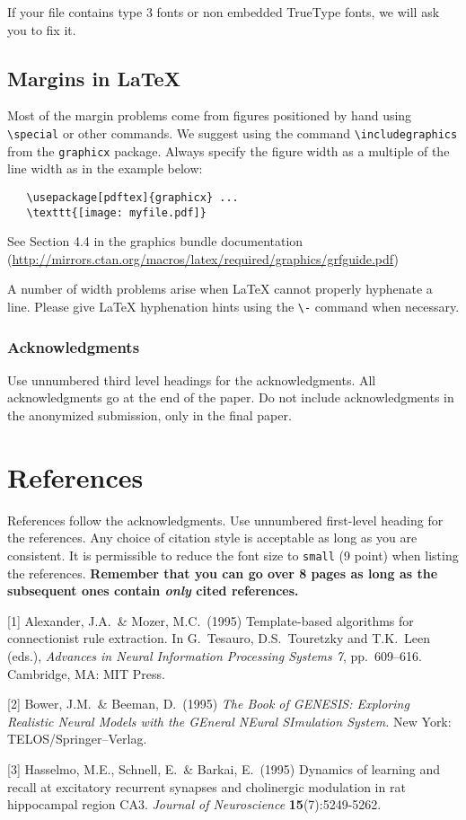 \documentclass{article}
\begin{document}
If your file contains type 3 fonts or non embedded TrueType fonts, we
will ask you to fix it.

\subsection{Margins in \LaTeX{}}

Most of the margin problems come from figures positioned by hand using
\verb+\special+ or other commands. We suggest using the command
\verb+\includegraphics+ from the \verb+graphicx+ package. Always
specify the figure width as a multiple of the line width as in the
example below:
\begin{verbatim}
   \usepackage[pdftex]{graphicx} ...
   \texttt{[image: myfile.pdf]}
\end{verbatim}
See Section 4.4 in the graphics bundle documentation
(\url{http://mirrors.ctan.org/macros/latex/required/graphics/grfguide.pdf})

A number of width problems arise when \LaTeX{} cannot properly
hyphenate a line. Please give LaTeX hyphenation hints using the
\verb+\-+ command when necessary.

\subsubsection*{Acknowledgments}

Use unnumbered third level headings for the acknowledgments. All
acknowledgments go at the end of the paper. Do not include
acknowledgments in the anonymized submission, only in the final paper.

\section*{References}

References follow the acknowledgments. Use unnumbered first-level
heading for the references. Any choice of citation style is acceptable
as long as you are consistent. It is permissible to reduce the font
size to \verb+small+ (9 point) when listing the references. {\bf
  Remember that you can go over 8 pages as long as the subsequent ones contain
  \emph{only} cited references.}
\medskip

\small

[1] Alexander, J.A.\ \& Mozer, M.C.\ (1995) Template-based algorithms
for connectionist rule extraction. In G.\ Tesauro, D.S.\ Touretzky and
T.K.\ Leen (eds.), {\it Advances in Neural Information Processing
  Systems 7}, pp.\ 609--616. Cambridge, MA: MIT Press.

[2] Bower, J.M.\ \& Beeman, D.\ (1995) {\it The Book of GENESIS:
  Exploring Realistic Neural Models with the GEneral NEural SImulation
  System.}  New York: TELOS/Springer--Verlag.

[3] Hasselmo, M.E., Schnell, E.\ \& Barkai, E.\ (1995) Dynamics of
learning and recall at excitatory recurrent synapses and cholinergic
modulation in rat hippocampal region CA3. {\it Journal of
  Neuroscience} {\bf 15}(7):5249-5262.
\end{document}
